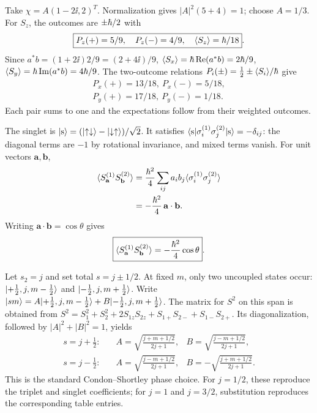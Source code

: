 Take $\chi=A(1-2\ii,2)^T$.
Normalization gives $|A|^2(5+4)=1$;
choose $\boxed{A=1/3}$.
For $S_z$, the outcomes are
$\pm\hbar/2$ with
\begin{equation}
\boxed{P_z(+)={5}/{9},\quad
P_z(-)={4}/{9},\quad
\langle S_z\rangle=\hbar/18}.
\end{equation}
Since $a^*b=(1+2\ii)2/9=(2+4\ii)/9$,
$\langle S_x\rangle=\hbar\,\mathrm{Re}(a^*b)=2\hbar/9$,
$\langle S_y\rangle=\hbar\,\mathrm{Im}(a^*b)=4\hbar/9$.
The two-outcome relations
$P_i(\pm)=\frac12\pm\langle S_i\rangle/\hbar$ give
\begin{align}
\boxed{P_x(+)=13/18,\ P_x(-)=5/18},\\
\boxed{P_y(+)=17/18,\ P_y(-)=1/18}.
\end{align}
Each pair sums to one and the
expectations follow from their weighted outcomes.

The singlet is
$\lvert \mathrm s\rangle=
(\lvert \uparrow\downarrow\rangle
-\lvert \downarrow\uparrow\rangle)/\sqrt2$.
It satisfies
$\langle \mathrm s\rvert\sigma_i^{(1)}
\sigma_j^{(2)}\lvert \mathrm s\rangle=-\delta_{ij}$:
the diagonal terms are $-1$ by rotational
invariance, and mixed terms vanish.
For unit vectors $\mathbf a,\mathbf b$,
\begin{align}
\langle S_{\mathbf a}^{(1)}
S_{\mathbf b}^{(2)}\rangle&=
\frac{\hbar^2}{4}
\sum_{ij}a_ib_j
\langle \sigma_i^{(1)}\sigma_j^{(2)}\rangle\\
&=-\frac{\hbar^2}{4}\,\mathbf a\cdot\mathbf b.
\end{align}
Writing $\mathbf a\cdot\mathbf b=\cos\theta$ gives
\begin{equation}
\boxed{\langle S_{\mathbf a}^{(1)}
S_{\mathbf b}^{(2)}\rangle=-\frac{\hbar^2}{4}\cos\theta}.
\end{equation}

Let $s_2=j$ and set total $s=j\pm1/2$.
At fixed $m$, only two uncoupled states occur:
$\lvert +\frac12,j,m-\frac12\rangle$ and
$\lvert -\frac12,j,m+\frac12\rangle$.
Write
$\lvert sm\rangle=A\lvert +\frac12,j,m-\frac12\rangle
+B\lvert -\frac12,j,m+\frac12\rangle$.
The matrix for $S^2$ on this span is
obtained from
$S^2=S_1^2+S_2^2+2S_{1z}S_{2z}+
S_{1+}S_{2-}+S_{1-}S_{2+}$.
Its diagonalization, followed by
$|A|^2+|B|^2=1$, yields
\begin{align}
\boxed{s=j+\tfrac12:}&\quad
A=\sqrt{\frac{j+m+1/2}{2j+1}},&
B=\sqrt{\frac{j-m+1/2}{2j+1}},\\
\boxed{s=j-\tfrac12:}&\quad
A=\sqrt{\frac{j-m+1/2}{2j+1}},&
B=-\sqrt{\frac{j+m+1/2}{2j+1}}.
\end{align}
This is the standard Condon--Shortley phase choice.
For $j=1/2$, these reproduce the triplet
and singlet coefficients; for $j=1$ and
$j=3/2$, substitution reproduces
the corresponding table entries.

